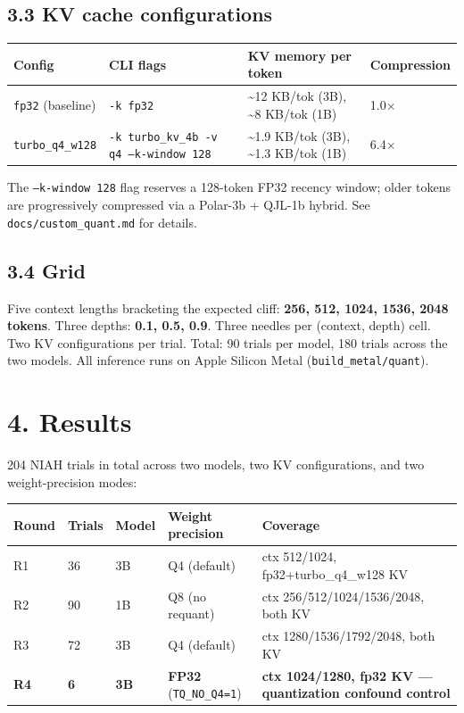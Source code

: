 \documentclass[11pt]{article}
\begin{document}
\subsection*{3.3 KV cache configurations}


\begin{center}
\begin{tabular}{llll}
\toprule
Config & CLI flags & KV memory per token & Compression \\
\midrule
\texttt{fp32} (baseline) & \texttt{-k fp32} & \textasciitilde{}12 KB/tok (3B), \textasciitilde{}8 KB/tok (1B) & 1.0× \\
\texttt{turbo\_q4\_w128} & \texttt{-k turbo\_kv\_4b -v q4 --k-window 128} & \textasciitilde{}1.9 KB/tok (3B), \textasciitilde{}1.3 KB/tok (1B) & 6.4× \\
\bottomrule
\end{tabular}
\end{center}


The \texttt{--k-window 128} flag reserves a 128-token FP32 recency window; older tokens are progressively compressed via a Polar-3b + QJL-1b hybrid. See \texttt{docs/custom\_quant.md} for details.


\subsection*{3.4 Grid}


Five context lengths bracketing the expected cliff: \textbf{256, 512, 1024, 1536, 2048 tokens}. Three depths: \textbf{0.1, 0.5, 0.9}. Three needles per (context, depth) cell. Two KV configurations per trial. Total: 90 trials per model, 180 trials across the two models. All inference runs on Apple Silicon Metal (\texttt{build\_metal/quant}).


\section*{4. Results}


204 NIAH trials in total across two models, two KV configurations, and two weight-precision modes:


\begin{center}
\begin{tabular}{lllll}
\toprule
Round & Trials & Model & Weight precision & Coverage \\
\midrule
R1 & 36 & 3B & Q4 (default) & ctx 512/1024, fp32+turbo\_q4\_w128 KV \\
R2 & 90 & 1B & Q8 (no requant) & ctx 256/512/1024/1536/2048, both KV \\
R3 & 72 & 3B & Q4 (default) & ctx 1280/1536/1792/2048, both KV \\
\textbf{R4} & \textbf{6} & \textbf{3B} & \textbf{FP32} (\texttt{TQ\_NO\_Q4=1}) & \textbf{ctx 1024/1280, fp32 KV — quantization confound control} \\
\bottomrule
\end{tabular}
\end{center}
\end{document}
